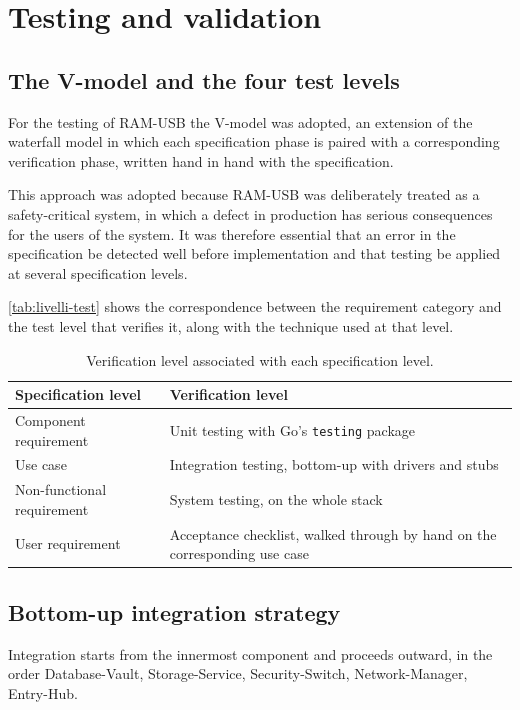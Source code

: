 \chapter{Testing and validation}
\label{chap:testing}

\section{The V-model and the four test levels}
For the testing of RAM-USB the V-model was adopted, an extension of the waterfall model in which
each specification phase is paired with a corresponding verification phase, written hand in hand with
the specification.

This approach was adopted because RAM-USB was deliberately treated as a
safety-critical system, in which a defect in production has serious consequences for the users of the system.
It was therefore essential that an error in the specification be detected well before implementation and
that testing be applied at several specification levels.

\autoref{tab:livelli-test} shows the correspondence between the requirement category and the test
level that verifies it, along with the technique used at that level.

\begin{table}[H]
\centering
\caption{Verification level associated with each specification level.}
\label{tab:livelli-test}
\begin{tabular}{@{}l p{}@{}}
\hline
\textbf{Specification level} & \textbf{Verification level} \\
\hline
Component requirement & Unit testing with Go's \texttt{testing} package \\
Use case & Integration testing, bottom-up with drivers and stubs \\
Non-functional requirement & System testing, on the whole stack \\
User requirement & Acceptance checklist, walked through by hand on the corresponding use case \\
\hline
\end{tabular}
\end{table}

\section{Bottom-up integration strategy}

Integration starts from the innermost component and proceeds outward, in the order Database-Vault,
Storage-Service, Security-Switch, Network-Manager, Entry-Hub.

